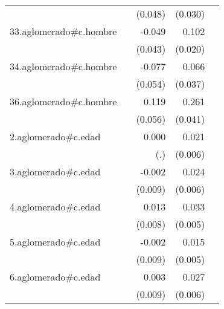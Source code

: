 {\begin{longtable}{l*{4}{D{.}{.}{-1}}}
            &                     &     (0.048)         &     (0.030)         &                     \\
\addlinespace
33.aglomerado#c.hombre&                     &      -0.049         &       0.102\sym{***}&                     \\
            &                     &     (0.043)         &     (0.020)         &                     \\
\addlinespace
34.aglomerado#c.hombre&                     &      -0.077         &       0.066         &                     \\
            &                     &     (0.054)         &     (0.037)         &                     \\
\addlinespace
36.aglomerado#c.hombre&                     &       0.119\sym{*}  &       0.261\sym{***}&                     \\
            &                     &     (0.056)         &     (0.041)         &                     \\
\addlinespace
2.aglomerado#c.edad&                     &       0.000         &       0.021\sym{***}&                     \\
            &                     &         (.)         &     (0.006)         &                     \\
\addlinespace
3.aglomerado#c.edad&                     &      -0.002         &       0.024\sym{***}&                     \\
            &                     &     (0.009)         &     (0.006)         &                     \\
\addlinespace
4.aglomerado#c.edad&                     &       0.013         &       0.033\sym{***}&                     \\
            &                     &     (0.008)         &     (0.005)         &                     \\
\addlinespace
5.aglomerado#c.edad&                     &      -0.002         &       0.015\sym{**} &                     \\
            &                     &     (0.009)         &     (0.005)         &                     \\
\addlinespace
6.aglomerado#c.edad&                     &       0.003         &       0.027\sym{***}&                     \\
            &                     &     (0.009)         &     (0.006)         &                     \\

\end{longtable}}
